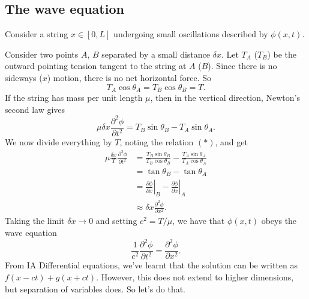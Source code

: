 \documentclass[a4paper]{article}
\begin{document}
\subsection{The wave equation}
Consider a string $x\in [0, L]$ undergoing small oscillations described by $\phi(x, t)$.
\begin{center}
\end{center} %
Consider two points $A$, $B$ separated by a small distance $\delta x$. Let $T_A$ ($T_B$) be the outward pointing tension tangent to the string at $A$ ($B$). Since there is no sideways ($x$) motion, there is no net horizontal force. So
\[
  T_A\cos \theta_A = T_B \cos \theta_B = T.\tag{$*$}
\]
If the string has mass per unit length $\mu$, then in the vertical direction, Newton's second law gives
\[
  \mu \delta x \frac{\partial^2 \phi}{\partial t^2} = T_B \sin \theta_B - T_A \sin \theta_A.
\]
We now divide everything by $T$, noting the relation $(*)$, and get
\begin{align*}
  \mu \frac{\delta x}{T}\frac{\partial^2 \phi}{\partial t^2} &= \frac{T_B \sin \theta_B}{T_B\cos \theta_B} - \frac{T_A \sin \theta_A}{T_A \cos \theta_A}\\
  &= \tan \theta_B - \tan \theta_A\\
  &= \left.\frac{\partial\phi}{\partial x}\right|_B - \left.\frac{\partial\phi}{\partial x}\right|_A\\
  &\approx \delta x\frac{\partial^2 \phi}{\partial x^2}.
\end{align*}
Taking the limit $\delta x \to 0$ and setting $c^2 = T/\mu$, we have that $\phi(x, t)$ obeys the wave equation
\[
  \frac{1}{c^2} \frac{\partial^2 \phi}{\partial t^2} = \frac{\partial^2 \phi}{\partial x^2}.
\]
From IA Differential equations, we've learnt that the solution can be written as $f(x - ct) + g(x + ct)$. However, this does not extend to higher dimensions, but separation of variables does. So let's do that.
\end{document}
